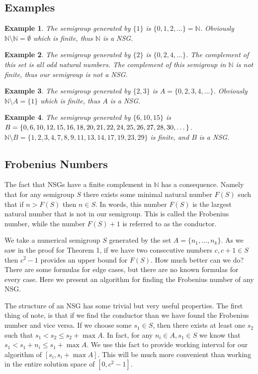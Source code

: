 \documentclass[11pt]{amsart}
\theoremstyle{plain}
\newtheorem{exa}{Example}
\theoremstyle{definition}
\begin{document}
\subsection{Examples}
\begin{exa}
  The semigroup generated by $\{1\}$ is $\{0,1,2,\dots \}=\mathbb{N}$. Obviously
  $\mathbb{N}\setminus \mathbb{N}=\emptyset$ which is finite, thus $\mathbb{N}$
  is a NSG.
\end{exa}
\begin{exa}
  The semigroup generated by $\{2\}$ is $\{0,2,4,\dots \}$. The complement of
  this set is all odd natural numbers. The complement of this semigroup in
  $\mathbb{N}$ is not finite, thus our semigroup is not a NSG.
\end{exa}
\begin{exa}
  The semigroup generated by $\{2,3\}$ is $A=\{0,2,3,4,\dots \}$. Obviously
  $\mathbb{N}\setminus A=\{1\}$ which is finite, thus $A$ is a NSG.
\end{exa}
\begin{exa}
  The semigroup generated by $\{6,10,15\}$ is $B=\{0, 6, 10, 12, 15, 16, 18,
  20, 21, 22,\\ 24, 25, 26, 27, 28, 30, \dots \}$. $\mathbb{N}\setminus
  B=\{1,2,3,4,7,8,9,11,13,
  14,17,19,23,29\}$ is finite, and $B$ is a NSG.
\end{exa}
\subsection{Frobenius Numbers}
The fact that NSGs have a finite complement in $\mathbb{N}$ has
a consequence. Namely that for any semigroup $S$ there exists some minimal
natural number $F(S)$ such that if $n>F(S)$ then $n\in S$. In words, this number
$F(S)$ is the largest natural number that is not in our semigroup. This is
called the Frobenius number, while the number $F(S)+1$ is referred to as
the conductor\cite{rosales}.

We take a numerical semigroup $S$ generated by the set $A=\{ n_1,\dots,n_k\}$.
As we saw in the proof for Theorem 1, if we have two consecutive numbers $c,c+1\in S$ then $c^2-1$ provides an upper bound for $F(S)$.
How much better can we do?
There are some formulas for edge cases, but there are no known formulas for every case.
Here we present an algorithm for finding the Frobenius number of any NSG.

The structure of an NSG has some trivial but very useful properties.
The first thing of note, is that if we find the conductor than  we have found the Frobenius number and vice versa.
If we choose some $s_1\in S$, then there exists at least one $s_2$ such that
$s_1<s_2\le s_2+\max A$.
In fact, for any $n_i\in A,s_1\in S$ we know that $s_1<s_1+n_i\le s_1+\max A$.
We use this fact to provide working interval for our algorithm of $[s_i,s_i+\max A]$.
This will be much more convenient than working in the entire solution space of $[0,c^2-1]$.
\end{document}
